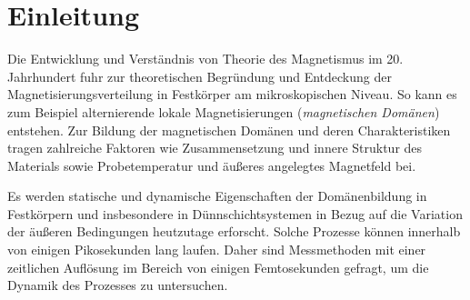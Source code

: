 \chapter{Einleitung}
\label{text:einleitung}


Die Entwicklung und Verständnis von Theorie des Magnetismus im 20. Jahrhundert fuhr zur theoretischen Begründung und Entdeckung der Magnetisierungsverteilung in Festkörper am mikroskopischen Niveau. So kann es zum Beispiel alternierende lokale Magnetisierungen (\emph{magnetischen Domänen}) entstehen. Zur Bildung der magnetischen Domänen und deren Charakteristiken tragen zahlreiche Faktoren wie Zusammensetzung und innere Struktur des Materials sowie Probetemperatur und äußeres angelegtes Magnetfeld bei.

\noindent
Es werden statische und dynamische Eigenschaften der Domänenbildung in Festkörpern und insbesondere in Dünnschichtsystemen in Bezug auf die Variation der äußeren Bedingungen heutzutage erforscht. Solche Prozesse können innerhalb von einigen Pikosekunden lang laufen. Daher sind Messmethoden mit einer zeitlichen Auflösung im Bereich von einigen Femtosekunden \cite{pfau_ultrafast_2012} gefragt, um die Dynamik des Prozesses zu untersuchen.

